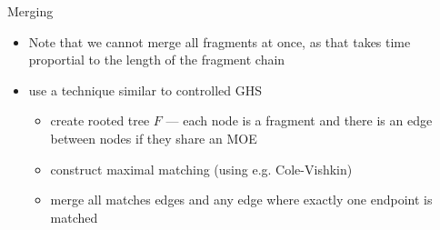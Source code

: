 \begin{frame}{Merging}
    \begin{itemize}
        \item Note that we cannot merge all fragments at once, as that takes time proportial to the length of the fragment chain
        \item use a technique similar to \alert{controlled GHS}
        \begin{itemize}
            \item create rooted tree $F$ --- each node is a fragment and there is an edge between nodes if they share an MOE
            \item construct maximal matching (using e.g. Cole-Vishkin)
            \item merge all matches edges and any edge where \alert{exactly} one
            endpoint is matched
        \end{itemize}
    \end{itemize}
\end{frame}